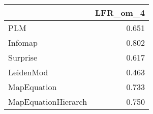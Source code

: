 \begin{tabular}{lr}
\toprule
{} & LFR_om_4 \\
\midrule
PLM                 &    0.651 \\
Infomap             &    0.802 \\
Surprise            &    0.617 \\
LeidenMod           &    0.463 \\
MapEquation         &    0.733 \\
MapEquationHierarch &    0.750 \\
\bottomrule
\end{tabular}
